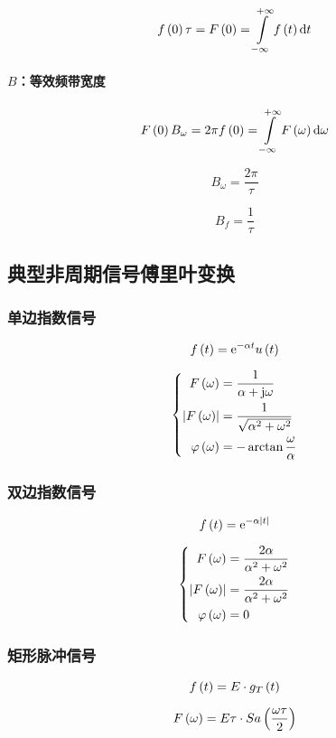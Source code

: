 \documentclass{article}
\begin{document}
\[f\pare{0}\tau=F\pare{0}=\impint\ft\d t\]

\paragraph{$B$：等效频带宽度}

\[F\pare{0}B_\omega=2\pi f\pare{0}=\impint \fw\d\omega\]

\[B_\omega=\frac{2\pi}\tau\]

\[B_f=\frac1\tau\]

\subsection{典型非周期信号傅里叶变换}

\subsubsection{单边指数信号}

\[f\left(t\right)=\mathrm e^{-\alpha t}u\left(t\right)\]

\[\left\{\begin{aligned}
        F\left(\omega\right)                  & =\frac1{\alpha+\mathrm j\omega}          \\
        \left|F\left(\omega\right)\right|            & =\frac1{\sqrt{\alpha^2+\omega^2}} \\
        \varphi\left(\omega\right) & =-\arctan\frac\omega\alpha
    \end{aligned}\right.\]

\subsubsection{双边指数信号}

\[f\left(t\right)=\mathrm e^{-\alpha\left|t\right|}\]

\[\left\{\begin{aligned}
        F\left(\omega\right)                  & =\frac{2\alpha}{\alpha^2+\omega^2} \\
        \left|F\left(\omega\right)\right|            & =\frac{2\alpha}{\alpha^2+\omega^2} \\
        \varphi\left(\omega\right) & =0
    \end{aligned}\right.\]

\subsubsection{矩形脉冲信号}

\[f\left(t\right)=E\cdot g_T\left(t\right)\]

\[F\left(\omega\right)=E\tau\cdot Sa\left(\frac{\omega\tau}2\right)\]
\end{document}
